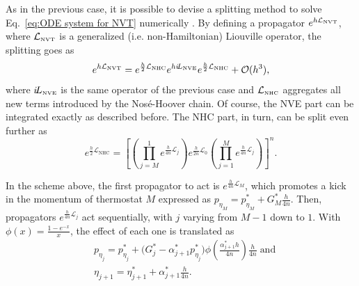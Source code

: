 \documentclass[
journal=jctcce,
layout=twocolumn
]{achemso}
\newcommand{\Liu}[1]{i\!L_\text{#1}}            %
\newcommand{\timestep}{h}
\begin{document}
As in the previous case, it is possible to devise a splitting method to solve Eq.~\eqref{eq:ODE system for NVT} numerically \cite{Tuckerman_2010}. By defining a propagator $e^{\timestep \mathcal{L}_\text{\tiny NVT}}$, where $\mathcal{L}_\text{\tiny NVT}$ is a generalized (i.e. non-Hamiltonian) Liouville operator, the splitting goes as
\begin{equation}
\label{eq:splitting NVT}
e^{\timestep \mathcal{L}_\text{\tiny NVT}} = e^{\frac{\timestep}{2} \mathcal{L}_\text{\tiny NHC}} e^{\timestep \Liu{\tiny NVE}} e^{\frac{\timestep}{2} \mathcal{L}_\text{\tiny NHC}} + \mathcal{O}(\timestep^3),
\end{equation}
where $\Liu{\tiny NVE}$ is the same operator of the previous case and $\mathcal{L}_\text{\tiny NHC}$ aggregates all new terms introduced by the Nos\'e-Hoover chain. Of course, the NVE part can be integrated exactly as described before. The NHC part, in turn, can be split even further as
\begin{equation*}
e^{\frac{\timestep}{2} \mathcal{L}_\text{NHC}} = \left[ \left( \textstyle\prod\limits_{j=M}^1 e^{\frac{\timestep}{4n} \mathcal{L}_j }\right) e^{\frac{\timestep}{2n} \mathcal{L}_0 } \left(  \textstyle\prod\limits_{j=1}^M e^{\frac{\timestep}{4n} \mathcal{L}_j }\right)  \right]^n.
\end{equation*}

In the scheme above, the first propagator to act is $e^{\frac{\timestep}{4n} \mathcal{L}_M}$, which promotes a kick in the momentum of thermostat $M$ expressed as $p_{\eta_M} = p_{\eta_M}^\ast + G_M^\ast \frac{\timestep}{4n}$. Then, propagators $e^{\frac{\timestep}{4n} \mathcal{L}_j}$ act sequentially, with $j$ varying from $M-1$ down to $1$. With $\phi(x) = \frac{1-e^{-x}}{x}$, the effect of each one is translated as
\begin{align*}
&p_{\eta_j} = p_{\eta_j}^\ast + \Big( G_j^\ast - \alpha_{j+1}^\ast p_{\eta_j}^\ast \Big) \phi\left(\frac{\alpha_{j+1}^\ast \timestep}{4n}\right) \frac{\timestep}{4n} \; \text{and} \\
&\eta_{j+1} = \eta_{j+1}^\ast + \alpha_{j+1}^\ast \frac{\timestep}{4n}.
\end{align*}
\end{document}
